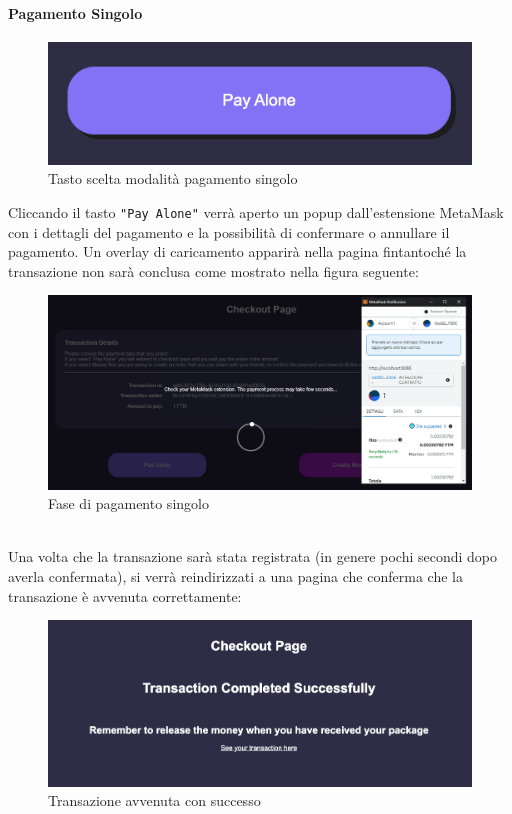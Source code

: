             \paragraph{Pagamento Singolo}
            \begin{figure}[H]
                \centering
                \includegraphics[scale=0.3]{immagini/Checkout/PayAlone.png}
                \caption{Tasto scelta modalità pagamento singolo}
            \end{figure}
            Cliccando il tasto \texttt{"Pay Alone"} verrà aperto un popup dall'estensione MetaMask con i dettagli del pagamento e la possibilità di confermare o annullare il pagamento. Un overlay di caricamento apparirà nella pagina \projectName{} fintantoché la transazione non sarà conclusa come mostrato nella figura seguente:
            \begin{figure}[H]
                \centering
                \includegraphics[scale=0.4]{immagini/Checkout/SinglePaymentLayer.png}
                \caption{Fase di pagamento singolo}
            \end{figure}
            \textbf{}\\
            Una volta che la transazione sarà stata registrata (in genere pochi secondi dopo averla confermata), si verrà reindirizzati a una pagina che conferma che la transazione è avvenuta correttamente:
            \begin{figure}[H]
                \centering
                \includegraphics[scale=0.3]{immagini/Checkout/PayAloneTransactionSuccess.png}
                \caption{Transazione avvenuta con successo}
            \end{figure}
